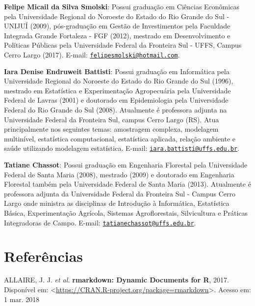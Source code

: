 \documentclass[12pt,brazil,oneside]{book}
\begin{document}
\textbf{Felipe Micail da Silva Smolski}: Possui graduação em Ciências Econômicas pela Universidade Regional do Noroeste do Estado do Rio Grande do Sul - UNIJUÍ (2009), pós-graduação em Gestão de Investimentos pela Faculdade Integrada Grande Fortaleza - FGF (2012), mestrado em Desenvolvimento e Políticas Públicas pela Universidade Federal da Fronteira Sul - UFFS, Campus Cerro Largo (2017). E-mail: \href{mailto:felipesmolski@hotmail.com}{\nolinkurl{felipesmolski@hotmail.com}}.

\textbf{Iara Denise Endruweit Battisti}: Possui graduação em Informática pela Universidade Regional do Noroeste do Estado do Rio Grande do Sul (1996), mestrado em Estatística e Experimentação Agropecuária pela Universidade Federal de Lavras (2001) e doutorado em Epidemiologia pela Universidade Federal do Rio Grande do Sul (2008). Atualmente é professora adjunta na Universidade Federal da Fronteira Sul, campus Cerro Largo (RS). Atua principalmente nos seguintes temas: amostragem complexa, modelagem multinível, estatística computacional, estatística aplicada, relação ambiente e saúde utilizando modelagem estatística. E-mail: \href{mailto:iara.battisti@uffs.edu.br}{\nolinkurl{iara.battisti@uffs.edu.br}}.

\textbf{Tatiane Chassot}: Possui graduação em Engenharia Florestal pela Universidade Federal de Santa Maria (2008), mestrado (2009) e doutorado em Engenharia Florestal também pela Universidade Federal de Santa Maria (2013). Atualmente é professora adjunta da Universidade Federal da Fronteira Sul - Campus Cerro Largo onde ministra as disciplinas de Introdução à Informática, Estatística Básica, Experimentação Agrícola, Sistemas Agroflorestais, Silvicultura e Práticas Integradoras de Campo. E-mail: \href{mailto:tatianechassot@uffs.edu.br}{\nolinkurl{tatianechassot@uffs.edu.br}}.

\setlength{\parindent}{0.0cm}

\RaggedRight

\frenchspacing

\hypertarget{referencias}{%
\chapter*{Referências}\label{referencias}}

\hypertarget{refs}{}
\leavevmode\hypertarget{ref-R-rmarkdown}{}%
ALLAIRE, J. J. \emph{et al.} \textbf{rmarkdown: Dynamic Documents for R}, 2017. Disponível em: \textless{}\url{https://CRAN.R-project.org/package=rmarkdown}\textgreater{}. Acesso em: 1 mar. 2018
\end{document}
